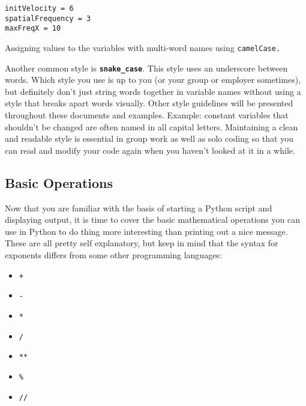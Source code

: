 \documentclass{book}
\begin{document}
\begin{listing}[htb]
\begin{mdframed}[backgroundcolor=codebg]
\begin{verbatim}
initVelocity = 6
spatialFrequency = 3
maxFreqX = 10
\end{verbatim}
\end{mdframed}
\caption{Assigning values to the variables with multi-word names using \texttt{camelCase.}}
\label{code:camelCase}
\end{listing}

Another common style is \textbf{\texttt{snake\_case}}. This style uses an underscore between words. Which style you use is up to you (or your group or employer sometimes), but definitely don't just string words together in variable names without using a style that breaks apart words visually. Other style guidelines will be presented throughout these documents and examples. Example: constant variables that shouldn't be changed are often named in all capital letters. Maintaining a clean and readable style is essential in group work as well as solo coding so that you can read and modify your code again when you haven't looked at it in a while.

\subsection{Basic Operations}
Now that you are familiar with the basis of starting a Python script and displaying output, it is time to cover the basic mathematical operations you can use in Python to do thing more interesting than printing out a nice message. These are all pretty self explanatory, but keep in mind that the syntax for exponents differs from some other programming languages:
\begin{itemize}
\item{ \texttt{+}}
\item{ \texttt{-}}
\item{ \texttt{*}}
\item{ \texttt{/}}
\item{ \texttt{**}}
\item{ \texttt{\%}}
\item{ \texttt{//}}
\end{itemize}
\end{document}
